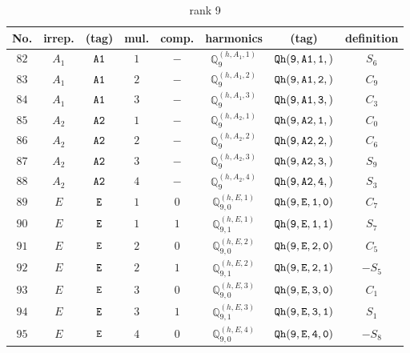 \documentclass[fleqn,8pt]{jsarticle}
\begin{document}
\begin{table}[ht!]
\begin{center}
\caption{rank 9}
\renewcommand{\arraystretch}{1.3}
\begin{tabular}{cccccccc} \hline \hline
No. & irrep. & (tag) & mul. & comp. & harmonics & (tag) & definition \\ \hline
$ 82 $ & $ A_{1} $ & $ {\tt A1} $ & $ 1 $ & $ - $ & $ \mathbb{Q}_{9}^{(h,A_{1},1)} $ & $ {\tt Qh(9,A1,1,)} $ & $ S_{6} $ \\
$ 83 $ & $ A_{1} $ & $ {\tt A1} $ & $ 2 $ & $ - $ & $ \mathbb{Q}_{9}^{(h,A_{1},2)} $ & $ {\tt Qh(9,A1,2,)} $ & $ C_{9} $ \\
$ 84 $ & $ A_{1} $ & $ {\tt A1} $ & $ 3 $ & $ - $ & $ \mathbb{Q}_{9}^{(h,A_{1},3)} $ & $ {\tt Qh(9,A1,3,)} $ & $ C_{3} $ \\
$ 85 $ & $ A_{2} $ & $ {\tt A2} $ & $ 1 $ & $ - $ & $ \mathbb{Q}_{9}^{(h,A_{2},1)} $ & $ {\tt Qh(9,A2,1,)} $ & $ C_{0} $ \\
$ 86 $ & $ A_{2} $ & $ {\tt A2} $ & $ 2 $ & $ - $ & $ \mathbb{Q}_{9}^{(h,A_{2},2)} $ & $ {\tt Qh(9,A2,2,)} $ & $ C_{6} $ \\
$ 87 $ & $ A_{2} $ & $ {\tt A2} $ & $ 3 $ & $ - $ & $ \mathbb{Q}_{9}^{(h,A_{2},3)} $ & $ {\tt Qh(9,A2,3,)} $ & $ S_{9} $ \\
$ 88 $ & $ A_{2} $ & $ {\tt A2} $ & $ 4 $ & $ - $ & $ \mathbb{Q}_{9}^{(h,A_{2},4)} $ & $ {\tt Qh(9,A2,4,)} $ & $ S_{3} $ \\
$ 89 $ & $ E $ & $ {\tt E} $ & $ 1 $ & $ 0 $ & $ \mathbb{Q}_{9,0}^{(h,E,1)} $ & $ {\tt Qh(9,E,1,0)} $ & $ C_{7} $ \\
$ 90 $ & $ E $ & $ {\tt E} $ & $ 1 $ & $ 1 $ & $ \mathbb{Q}_{9,1}^{(h,E,1)} $ & $ {\tt Qh(9,E,1,1)} $ & $ S_{7} $ \\
$ 91 $ & $ E $ & $ {\tt E} $ & $ 2 $ & $ 0 $ & $ \mathbb{Q}_{9,0}^{(h,E,2)} $ & $ {\tt Qh(9,E,2,0)} $ & $ C_{5} $ \\
$ 92 $ & $ E $ & $ {\tt E} $ & $ 2 $ & $ 1 $ & $ \mathbb{Q}_{9,1}^{(h,E,2)} $ & $ {\tt Qh(9,E,2,1)} $ & $ - S_{5} $ \\
$ 93 $ & $ E $ & $ {\tt E} $ & $ 3 $ & $ 0 $ & $ \mathbb{Q}_{9,0}^{(h,E,3)} $ & $ {\tt Qh(9,E,3,0)} $ & $ C_{1} $ \\
$ 94 $ & $ E $ & $ {\tt E} $ & $ 3 $ & $ 1 $ & $ \mathbb{Q}_{9,1}^{(h,E,3)} $ & $ {\tt Qh(9,E,3,1)} $ & $ S_{1} $ \\
$ 95 $ & $ E $ & $ {\tt E} $ & $ 4 $ & $ 0 $ & $ \mathbb{Q}_{9,0}^{(h,E,4)} $ & $ {\tt Qh(9,E,4,0)} $ & $ - S_{8} $ \\

\end{tabular}
\end{center}
\end{table}
\end{document}
